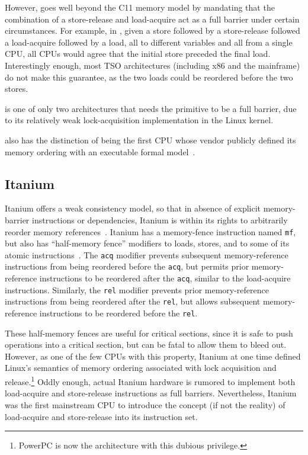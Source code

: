 However,  goes well beyond the C11 memory model by mandating that
the combination of a store-release and load-acquire act as a full
barrier under certain circumstances.
For example, in , given a store followed by a store-release followed
a load-acquire followed by a load, all to different variables and all from
a single CPU, all CPUs
would agree that the initial store preceded the final load.
Interestingly enough, most TSO architectures (including x86 and the
mainframe) do not make this guarantee, as the two loads could be
reordered before the two stores.

 is one of only two architectures that needs the
 primitive to be a full barrier,
due to its relatively weak lock-acquisition implementation in
the Linux kernel.

 also has the distinction of being the first CPU whose vendor publicly
defined its memory ordering with an executable formal model~\cite{ARMv8A:2017}.

\subsection{Itanium}
\label{sec:memorder:Itanium}

Itanium offers a weak consistency model, so that in absence of explicit
memory-barrier instructions or dependencies, Itanium is within its rights
to arbitrarily reorder memory references~\cite{IntelItanium02v2}.
Itanium has a memory-fence instruction named {\tt mf}, but also has
``half-memory fence'' modifiers to loads, stores, and to some of its atomic
instructions~\cite{IntelItanium02v3}.
The {\tt acq} modifier prevents subsequent memory-reference instructions
from being reordered before the {\tt acq}, but permits
prior memory-reference instructions to be reordered after the {\tt acq},
similar to the  load-acquire instructions.
Similarly, the {\tt rel} modifier prevents prior memory-reference
instructions from being reordered after the {\tt rel}, but allows
subsequent memory-reference instructions to be reordered before
the {\tt rel}.

These half-memory fences are useful for critical sections, since
it is safe to push operations into a critical section, but can be
fatal to allow them to bleed out.
However, as one of the few CPUs with this property, Itanium at one
time defined Linux's semantics of memory ordering associated with lock
acquisition and release.\footnote{
	PowerPC is now the architecture with this dubious privilege.}
Oddly enough, actual Itanium hardware is rumored to implement
both load-acquire and store-release instructions as full barriers.
Nevertheless, Itanium was the first mainstream CPU to introduce the concept
(if not the reality) of load-acquire and store-release into its
instruction set.

